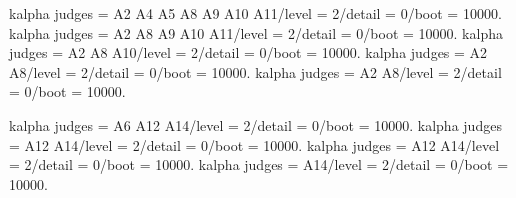 kalpha judges = A2 A4 A5 A8 A9 A10 A11/level = 2/detail = 0/boot = 10000.
kalpha judges = A2 A8 A9 A10 A11/level = 2/detail = 0/boot = 10000.
kalpha judges = A2 A8 A10/level = 2/detail = 0/boot = 10000.
kalpha judges = A2 A8/level = 2/detail = 0/boot = 10000.
kalpha judges = A2 A8/level = 2/detail = 0/boot = 10000.

kalpha judges = A6 A12 A14/level = 2/detail = 0/boot = 10000.
kalpha judges = A12 A14/level = 2/detail = 0/boot = 10000.
kalpha judges = A12 A14/level = 2/detail = 0/boot = 10000.
kalpha judges = A14/level = 2/detail = 0/boot = 10000.